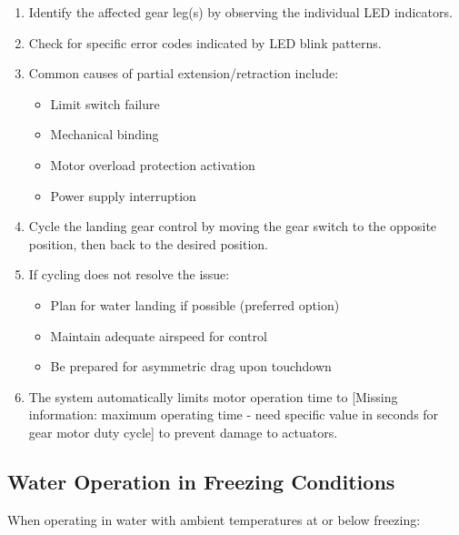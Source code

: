 \documentclass[12pt,a4paper,twoside,openright]{book}
\begin{document}
\begin{enumerate}
    \item Identify the affected gear leg(s) by observing the individual LED indicators.
    \item Check for specific error codes indicated by LED blink patterns.
    \item Common causes of partial extension/retraction include:
    \begin{itemize}
        \item Limit switch failure
        \item Mechanical binding
        \item Motor overload protection activation
        \item Power supply interruption
    \end{itemize}
    \item Cycle the landing gear control by moving the gear switch to the opposite position, then back to the desired position.
    \item If cycling does not resolve the issue:
    \begin{itemize}
        \item Plan for water landing if possible (preferred option)
        \item Maintain adequate airspeed for control
        \item Be prepared for asymmetric drag upon touchdown
    \end{itemize}
    \item The system automatically limits motor operation time to {\color{red}[Missing information: maximum operating time - need specific value in seconds for gear motor duty cycle]} to prevent damage to actuators.
\end{enumerate}

\subsection{Water Operation in Freezing Conditions}

When operating in water with ambient temperatures at or below freezing:
\end{document}

